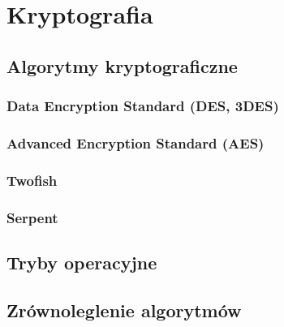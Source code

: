 \chapter{Kryptografia}

\section{Algorytmy kryptograficzne}

\subsection{Data Encryption Standard (DES, 3DES)}

\subsection{Advanced Encryption Standard (AES)}

\subsection{Twofish}

\subsection{Serpent}

\section{Tryby operacyjne}

\section{Zrównoleglenie algorytmów}
